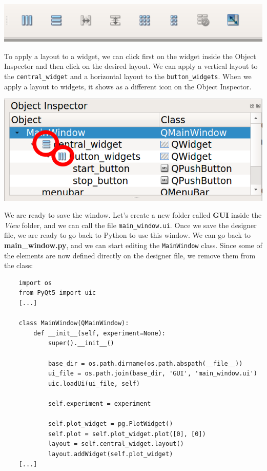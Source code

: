 \begin{center}
    \includegraphics[width=.4\textwidth]{images/Chapter_09/06_layouts.png}
\end{center}

To apply a layout to a widget, we can click first on the widget inside the Object Inspector and then click on the desired layout. We can apply a vertical layout to the \texttt{central\_widget} and a horizontal layout to the \texttt{button\_widgets}. When we apply a layout to widgets, it shows as a different icon on the Object Inspector.

\begin{center}
    \includegraphics[width=.4\textwidth]{images/Chapter_09/07_widgets_with_layouts.png}
\end{center}

We are ready to save the window. Let's create a new folder called \textbf{GUI} inside the \emph{View} folder, and we can call the file \texttt{main\_window.ui}. Once we save the designer file, we are ready to go back to Python to use this window. We can go back to \textbf{main\_window.py}, and we can start editing the \texttt{MainWindow} class. Since some of the elements are now defined directly on the designer file, we remove them from the class:

\begin{verbatim}
    import os
    from PyQt5 import uic
    [...]

    class MainWindow(QMainWindow):
        def __init__(self, experiment=None):
            super().__init__()

            base_dir = os.path.dirname(os.path.abspath(__file__))
            ui_file = os.path.join(base_dir, 'GUI', 'main_window.ui')
            uic.loadUi(ui_file, self)

            self.experiment = experiment

            self.plot_widget = pg.PlotWidget()
            self.plot = self.plot_widget.plot([0], [0])
            layout = self.central_widget.layout()
            layout.addWidget(self.plot_widget)
    [...]
\end{verbatim}

